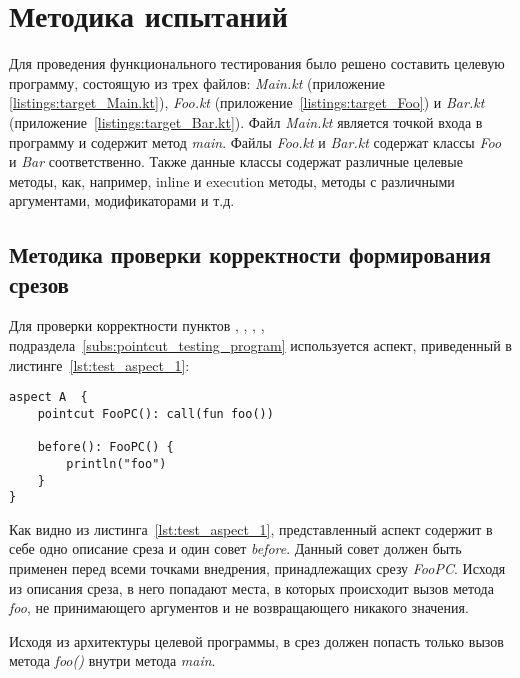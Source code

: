 \section{Методика испытаний}
\label{sec:testing_methodology}
Для проведения функционального тестирования было решено составить целевую программу, состоящую из трех файлов: \textit{Main.kt} (приложение \ref{listings:target_Main.kt}), \textit{Foo.kt} (приложение~\ref{listings:target_Foo}) и \textit{Bar.kt} (приложение~\ref{listings:target_Bar.kt}).
Файл \textit{Main.kt} является точкой входа в программу и содержит метод \textit{main}.
Файлы \textit{Foo.kt} и \textit{Bar.kt} содержат классы \textit{Foo} и \textit{Bar} соответственно.
Также данные классы содержат различные целевые методы, как, например, inline и execution методы, методы с различными аргументами, модификаторами и т.д.
\subsection{Методика проверки корректности формирования срезов}
\label{sub:pointcut_building_methodology}
Для проверки корректности пунктов
\quotes{\ref{list:method_name_check}},
\quotes{\ref{list:class_name_check}},
\quotes{\ref{list:method_params_check}},
\quotes{\ref{list:call_check}},
\quotes{\ref{list:reference_pointcut_check}} подраздела~\ref{subs:pointcut_testing_program} используется аспект, приведенный в листинге~\ref{lst:test_aspect_1}:
\begin{lstlisting}[style={java}, label={lst:test_aspect_1},
  caption={Пример тестового аспекта}]
aspect A  {
    pointcut FooPC(): call(fun foo())

    before(): FooPC() {
        println("foo")
    }
}
\end{lstlisting}
Как видно из листинга~\ref{lst:test_aspect_1}, представленный аспект содержит в себе одно описание среза и один совет \textit{before}.
Данный совет должен быть применен перед всеми точками внедрения, принадлежащих срезу \textit{FooPC}.
Исходя из описания среза, в него попадают места, в которых происходит вызов метода \textit{foo}, не принимающего аргументов и не возвращающего никакого значения.

Исходя из архитектуры целевой программы, в срез должен попасть только вызов метода \textit{foo()} внутри метода \textit{main}.

